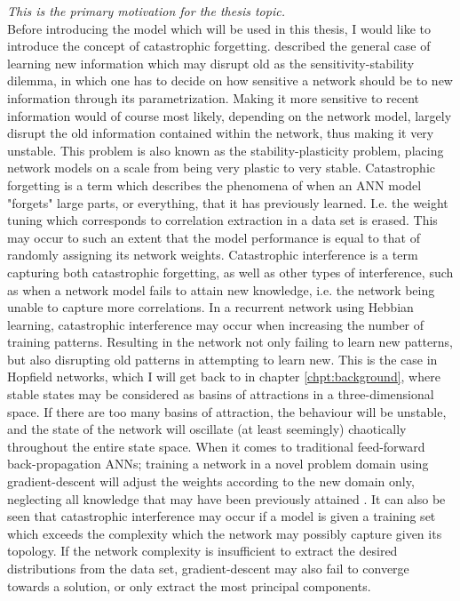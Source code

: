 \textit{This is the primary motivation for the thesis topic.}
\\

Before introducing the model which will be used in this thesis, I would like to introduce the concept of catastrophic forgetting.
\cite{Hebb1949} described the general case of learning new information which may disrupt old as the sensitivity-stability dilemma, in which one has to decide on how sensitive a network should be to new information through its parametrization. Making it more sensitive to recent information would of course most likely, depending on the network model, largely disrupt the old information contained within the network, thus making it very unstable. This problem is also known as the stability-plasticity \citep{Carpenter1987} problem, placing network models on a scale from being very plastic to very stable.
Catastrophic forgetting \citep{McCloskey1989, Ratcliff1990} is a term which describes the phenomena of when an ANN model "forgets" large parts, or everything, that it has previously learned. I.e. the weight tuning which corresponds to correlation extraction in a data set is erased. This may occur to such an extent that the model performance is equal to that of randomly assigning its network weights. Catastrophic interference is a term capturing both catastrophic forgetting, as well as other types of interference, such as when a network model fails to attain new knowledge, i.e. the network being unable to capture more correlations. In a recurrent network using Hebbian learning, catastrophic interference may occur when increasing the number of training patterns. Resulting in the network not only failing to learn new patterns, but also disrupting old patterns in attempting to learn new. This is the case in Hopfield networks, which I will get back to in chapter \ref{chpt:background}, where stable states may be considered as basins of attractions in a three-dimensional space. If there are too many basins of attraction, the behaviour will be unstable, and the state of the network will oscillate (at least seemingly) chaotically throughout the entire state space.
When it comes to traditional feed-forward back-propagation ANNs; training a network in a novel problem domain using gradient-descent will adjust the weights according to the new domain only, neglecting all knowledge that may have been previously attained \citep{McCloskey1989, French1999, French2001}.
It can also be seen that catastrophic interference may occur if a model is given a training set which exceeds the complexity which the network may possibly capture given its topology. If the network complexity is insufficient to extract the desired distributions from the data set, gradient-descent may also fail to converge towards a solution, or only extract the most principal components.

